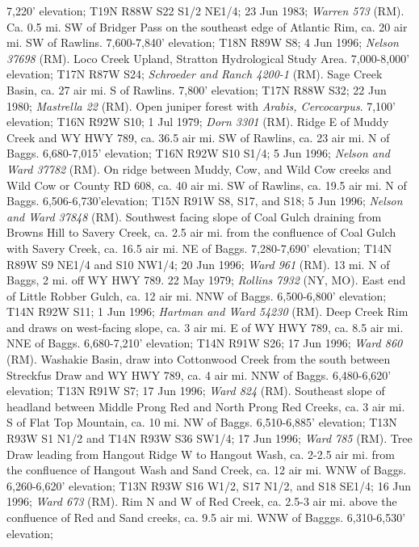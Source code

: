 7,220’ elevation; T19N R88W S22 S1/2 NE1/4; 23 Jun 1983;
\textit{Warren 573} (RM).
Ca. 0.5 mi. SW of Bridger Pass on the southeast edge of Atlantic Rim, ca. 20 air
mi. SW of Rawlins. 7,600-7,840’ elevation; T18N R89W S8; 4 Jun 1996;
\textit{Nelson 37698} (RM).
Loco Creek Upland, Stratton Hydrological Study Area. 7,000-8,000’ elevation;
T17N R87W S24; \textit{Schroeder and Ranch 4200-1} (RM).
Sage Creek Basin, ca. 27 air mi. S of Rawlins. 7,800’ elevation; T17N R88W S32;
22 Jun 1980; \textit{Mastrella 22} (RM).
Open juniper forest with \textit{Arabis, Cercocarpus}. 7,100’ elevation;
T16N R92W S10; 1 Jul 1979; \textit{Dorn 3301} (RM).
Ridge E of Muddy Creek and WY HWY 789, ca. 36.5 air mi. SW of Rawlins, ca. 23
air mi. N of Baggs. 6,680-7,015’ elevation; T16N R92W S10 S1/4; 5 Jun 1996;
\textit{Nelson and Ward 37782} (RM).
On ridge between Muddy, Cow, and Wild Cow creeks and Wild Cow or County RD
608, ca. 40 air mi. SW of Rawlins, ca. 19.5 air mi. N of Baggs.
6,506-6,730’elevation; T15N R91W S8, S17, and S18; 5 Jun 1996;
\textit{Nelson and Ward 37848} (RM).
Southwest facing slope of Coal Gulch draining from Browns Hill to Savery Creek,
ca. 2.5 air mi. from the confluence of Coal Gulch with Savery Creek, ca. 16.5
air mi. NE of Baggs.	7,280-7,690' elevation; T14N R89W S9 NE1/4 and S10 NW1/4;
20 Jun 1996; \textit{Ward 961} (RM).
13 mi. N of Baggs, 2 mi. off WY HWY 789. 22 May 1979;
\textit{Rollins 7932} (NY, MO).
East end of Little Robber Gulch, ca. 12 air mi. NNW of Baggs. 6,500-6,800’
elevation; T14N R92W S11; 1 Jun 1996; \textit{Hartman and Ward 54230} (RM).
Deep Creek Rim and draws on west-facing slope, ca. 3 air mi. E of WY HWY 789,
ca. 8.5 air mi. NNE of Baggs. 6,680-7,210’ elevation; T14N R91W S26;
17 Jun 1996; \textit{Ward 860} (RM).
Washakie Basin, draw into Cottonwood Creek from the south between Streckfus Draw
and WY HWY 789, ca. 4 air mi. NNW of Baggs. 6,480-6,620’ elevation;
T13N R91W S7; 17 Jun 1996; \textit{Ward 824} (RM).
Southeast slope of headland between Middle Prong Red and North
Prong Red Creeks, ca. 3 air mi. S of Flat Top Mountain, ca. 10 mi. NW of Baggs.
6,510-6,885’ elevation; T13N R93W S1 N1/2 and T14N R93W S36 SW1/4; 17 Jun 1996;
\textit{Ward 785} (RM).
Tree Draw leading from Hangout Ridge W to Hangout Wash, ca.
2-2.5 air mi. from the confluence of Hangout Wash and Sand Creek, ca. 12 air mi.
WNW of Baggs. 6,260-6,620’ elevation; T13N R93W S16 W1/2, S17 N1/2, and
S18 SE1/4; 16 Jun 1996; \textit{Ward 673} (RM).
Rim N and W of Red Creek, ca. 2.5-3 air mi. above the confluence
of Red and Sand creeks, ca. 9.5 air mi. WNW of Bagggs. 6,310-6,530’ elevation;
